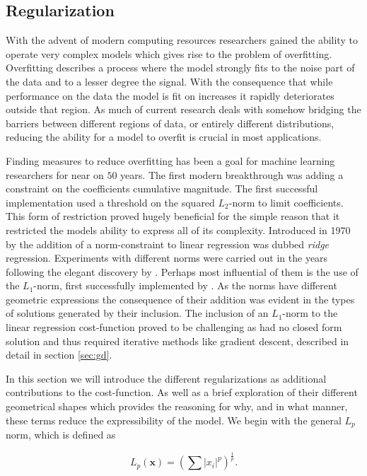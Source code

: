 \subsection{Regularization}\label{sec:regularization}

With the advent of modern computing resources researchers gained the ability to operate very complex models which gives rise to the problem of overfitting. Overfitting describes a process where the model strongly fits to the noise part of the data and to a lesser degree the signal. With the consequence that while performance on the data the model is fit on increases it rapidly deteriorates outside that region. As much of current research deals with somehow bridging the barriers between different regions of data, or entirely different distributions, reducing the ability for a model to overfit is crucial in most applications. 

Finding measures to reduce overfitting has been a goal for machine learning researchers for near on $50$ years. The first modern breakthrough was adding a constraint on the coefficients cumulative magnitude. The first successful implementation used a threshold on the squared $L_2$-norm to limit coefficients. This form of restriction proved hugely beneficial for the simple reason that it restricted the models ability to express all of its complexity. Introduced in 1970 by \citet{Hoerl1970} the addition of a norm-constraint to linear regression was dubbed \textit{ridge} regression. Experiments with different norms were carried out in the years following the elegant discovery by \cite{Hoerl1970}. Perhaps most influential of them is the use of the $L_1$-norm, first successfully implemented by \citet{Tibshirani1996}. As the norms have different geometric expressions the consequence of their addition was evident in the types of solutions generated by their inclusion. The inclusion of an $L_1$-norm to the linear regression cost-function proved to be challenging as had no closed form solution and thus required iterative methods like gradient descent, described in detail in section \ref{sec:gd}. 

In this section we will introduce the different regularizations as additional contributions to the cost-function. As well as a brief exploration of their different geometrical shapes which provides the reasoning for why, and in what manner, these terms reduce the expressibility of the model. We begin with the general $L_p$ norm, which is defined as

\begin{equation}
L_p(\mathbf{x}) = \left(\sum |x_i|^p\right)^{\frac{1}{p}}.
\end{equation}


